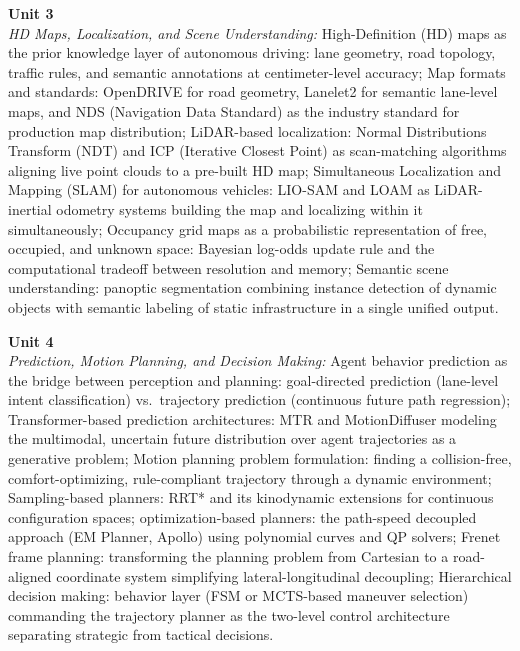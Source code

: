 \vspace{0.3cm}

\noindent\textbf{Unit 3} \\
\textit{HD Maps, Localization, and Scene Understanding:} High-Definition (HD) maps as the prior knowledge layer of autonomous driving: lane geometry, road topology, traffic rules, and semantic annotations at centimeter-level accuracy; Map formats and standards: OpenDRIVE for road geometry, Lanelet2 for semantic lane-level maps, and NDS (Navigation Data Standard) as the industry standard for production map distribution; LiDAR-based localization: Normal Distributions Transform (NDT) and ICP (Iterative Closest Point) as scan-matching algorithms aligning live point clouds to a pre-built HD map; Simultaneous Localization and Mapping (SLAM) for autonomous vehicles: LIO-SAM and LOAM as LiDAR-inertial odometry systems building the map and localizing within it simultaneously; Occupancy grid maps as a probabilistic representation of free, occupied, and unknown space: Bayesian log-odds update rule and the computational tradeoff between resolution and memory; Semantic scene understanding: panoptic segmentation combining instance detection of dynamic objects with semantic labeling of static infrastructure in a single unified output.

\vspace{0.3cm}

\noindent\textbf{Unit 4} \\
\textit{Prediction, Motion Planning, and Decision Making:} Agent behavior prediction as the bridge between perception and planning: goal-directed prediction (lane-level intent classification) vs.\ trajectory prediction (continuous future path regression); Transformer-based prediction architectures: MTR and MotionDiffuser modeling the multimodal, uncertain future distribution over agent trajectories as a generative problem; Motion planning problem formulation: finding a collision-free, comfort-optimizing, rule-compliant trajectory through a dynamic environment; Sampling-based planners: RRT* and its kinodynamic extensions for continuous configuration spaces; optimization-based planners: the path-speed decoupled approach (EM Planner, Apollo) using polynomial curves and QP solvers; Frenet frame planning: transforming the planning problem from Cartesian to a road-aligned coordinate system simplifying lateral-longitudinal decoupling; Hierarchical decision making: behavior layer (FSM or MCTS-based maneuver selection) commanding the trajectory planner as the two-level control architecture separating strategic from tactical decisions.


